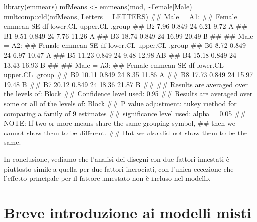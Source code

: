 \documentclass[a4paper,12pt,oneside]{book}
\newenvironment{Shaded}{\begin{snugshade}}{\end{snugshade}}
\newcommand{\SpecialCharTok}[1]{#1}
\newcommand{\DocumentationTok}[1]{#1}
\newcommand{\OtherTok}[1]{#1}
\newcommand{\FunctionTok}[1]{#1}
\newcommand{\AttributeTok}[1]{#1}
\newcommand{\AlertTok}[1]{#1}
\newcommand{\NormalTok}[1]{#1}
\begin{document}
\begin{Shaded}
\begin{Highlighting}[]
\FunctionTok{library}\NormalTok{(emmeans)}
\NormalTok{mfMeans }\OtherTok{\textless{}{-}} \FunctionTok{emmeans}\NormalTok{(mod, }\SpecialCharTok{\textasciitilde{}}\NormalTok{Female}\SpecialCharTok{|}\NormalTok{Male)}
\NormalTok{multcomp}\SpecialCharTok{::}\FunctionTok{cld}\NormalTok{(mfMeans, }\AttributeTok{Letters =}\NormalTok{ LETTERS)}
\DocumentationTok{\#\# Male = A1:}
\DocumentationTok{\#\#  Female emmean    SE df lower.CL upper.CL .group}
\DocumentationTok{\#\#  B2       7.96 0.849 24     6.21     9.72  A    }
\DocumentationTok{\#\#  B1       9.51 0.849 24     7.76    11.26  A    }
\DocumentationTok{\#\#  B3      18.74 0.849 24    16.99    20.49   B   }
\DocumentationTok{\#\# }
\DocumentationTok{\#\# Male = A2:}
\DocumentationTok{\#\#  Female emmean    SE df lower.CL upper.CL .group}
\DocumentationTok{\#\#  B6       8.72 0.849 24     6.97    10.47  A    }
\DocumentationTok{\#\#  B5      11.23 0.849 24     9.48    12.98  AB   }
\DocumentationTok{\#\#  B4      15.18 0.849 24    13.43    16.93   B   }
\DocumentationTok{\#\# }
\DocumentationTok{\#\# Male = A3:}
\DocumentationTok{\#\#  Female emmean    SE df lower.CL upper.CL .group}
\DocumentationTok{\#\#  B9      10.11 0.849 24     8.35    11.86  A    }
\DocumentationTok{\#\#  B8      17.73 0.849 24    15.97    19.48   B   }
\DocumentationTok{\#\#  B7      20.12 0.849 24    18.36    21.87   B   }
\DocumentationTok{\#\# }
\DocumentationTok{\#\# Results are averaged over the levels of: Block }
\DocumentationTok{\#\# Confidence level used: 0.95 }
\DocumentationTok{\#\# Results are averaged over some or all of the levels of: Block }
\DocumentationTok{\#\# P value adjustment: tukey method for comparing a family of 9 estimates }
\DocumentationTok{\#\# significance level used: alpha = 0.05 }
\DocumentationTok{\#\# }\AlertTok{NOTE}\DocumentationTok{: If two or more means share the same grouping symbol,}
\DocumentationTok{\#\#       then we cannot show them to be different.}
\DocumentationTok{\#\#       But we also did not show them to be the same.}
\end{Highlighting}
\end{Shaded}

In conclusione, vediamo che l'analisi dei disegni con due fattori innestati è piuttosto simile a quella per due fattori incrociati, con l'unica eccezione che l'effetto principale per il fattore innestato non è incluso nel modello.

\hypertarget{breve-introduzione-ai-modelli-misti}{%
\chapter{Breve introduzione ai modelli misti}\label{breve-introduzione-ai-modelli-misti}}
\end{document}
